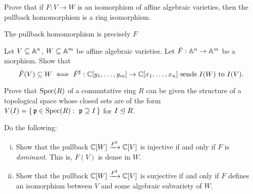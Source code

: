 \documentclass[12pt]{memoir}
\begin{document}
\begin{Ej}
  Prove that if $F : V \to W$ is an isomorphism of affine algebraic varieties, then the pullback homomorphism is a ring isomorphism.
\end{Ej}

\begin{ptcbr}
  The pullback homomorphism is precisely $F$
\end{ptcbr}

\begin{Ej}
  Let $V\subseteq \mathbb{A}^n$, $W\subseteq \mathbb{A}^m$ be affine algebraic varieties. Let $\tilde{F}:\mathbb{A}^n\to\mathbb{A}^m$ be a morphism. Show that 
  $$\tilde{F}(V)\subseteq W\iff \tilde{F}^\sharp:\mathbb{C}[y_1,\dots,y_m]\to\mathbb{C}[x_1,\dots,x_n]\ \text{sends } I(W)\ \text{to } I(V).$$
\end{Ej}

\begin{Ej}[2.6.1]
  Prove that $\operatorname{Spec}(R)$ of a commutative ring $R$ can be given the structure of a topological space whose closed sets are of the form $V(I)=\set{\lie p\in\Spec(R):\ \lie p\supseteq I}$ for $I\trianglelefteq R$.
\end{Ej}

\begin{Ej}[2.5.(1,2)]
  Do the following:
  \begin{enumerate}[i)]
    \itemsep=-0.4em
    \item Show that the pullback $\mathbb{C}[W]\xrightarrow{F^\sharp}\mathbb{C}[V]$ is injective if and only if $F$ is \emph{dominant}. This is, $F(V)$ is dense in $W$.
    \item Show that the pullback $\mathbb{C}[W]\xrightarrow{F^\sharp}\mathbb{C}[V]$ is surjective if and only if $F$ defines an isomorphism between $V$ and some algebraic subvariety of $W$.
     
  \end{enumerate}
 \end{Ej}
\end{document}
